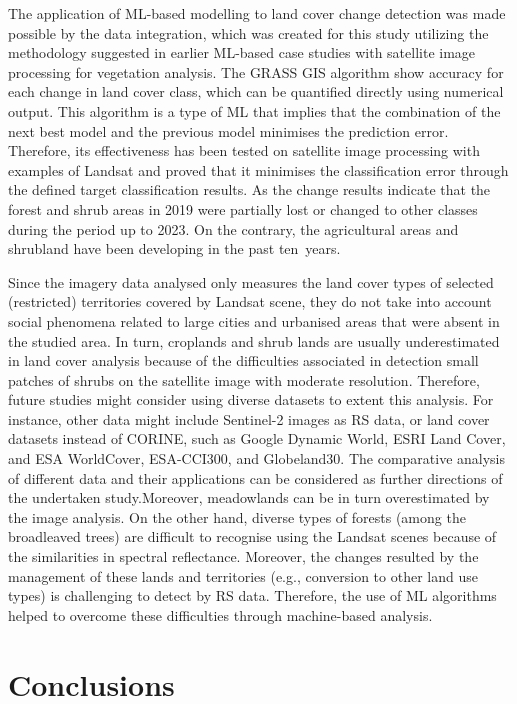 \documentclass[jimaging,article,accept,pdftex,oneauthor]{Definitions/mdpi}
\begin{document}
The application of {ML-based} modelling to land cover change detection was made possible by the data integration, which was created for this study utilizing the methodology suggested in earlier ML-based case studies with satellite image processing for vegetation analysis. The GRASS GIS algorithm show accuracy for each change in land cover class, which can be quantified directly using numerical output. This algorithm is a type of ML that implies that the combination of the next best model and the previous model minimises the prediction error. Therefore, its effectiveness has been tested on satellite image processing with examples of Landsat and proved that it minimises the classification error through the defined target classification results. As the change results indicate that the forest and shrub areas in 2019 were partially lost or changed to other classes during the period up to 2023. On the contrary, the agricultural areas and shrubland have been developing in the past ten~years.

Since the imagery data analysed only measures the land cover types of selected (restricted) territories covered by Landsat scene, they do not take into account social phenomena related to large cities and urbanised areas that were absent in the studied area. In turn, croplands and shrub lands are usually underestimated in land cover analysis because of the difficulties associated in detection small patches of shrubs on the satellite image with moderate resolution. {Therefore, future studies might consider using diverse datasets to extent this analysis. For instance, other data might include Sentinel-2 images as RS data, or land cover datasets instead of CORINE, such as Google Dynamic World, ESRI Land Cover, and ESA WorldCover, ESA-CCI300, and Globeland30. The comparative analysis of different data and their applications can be considered as further directions of the undertaken study.}Moreover, meadowlands can be in turn overestimated by the image analysis. On the other hand, diverse types of forests (among the broadleaved trees) are difficult to recognise using the Landsat scenes because of the similarities in spectral reflectance. Moreover, the changes resulted by the management of these lands and territories (e.g., conversion to other land use types) is challenging to detect by RS data. Therefore, the use of ML algorithms helped to overcome these difficulties through machine-based analysis.

\section{Conclusions}
\label{sec5}
\end{document}
